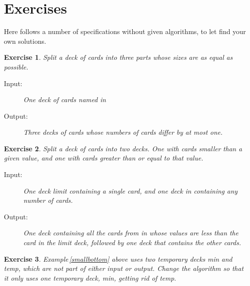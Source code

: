 \documentclass[a4paper,twoside]{tufte-handout}
\newtheorem{exercise}{Exercise}
\begin{document}
\clearpage

\section{Exercises}\label{sec-exer}

Here follows a number of specifications without given algorithms, to let
find your own solutions.

\begin{exercise}
  Split a deck of cards into three parts whose sizes are as equal as possible.
  \begin{description}
  \item[Input:] One deck of cards named \emph{in}
  \item[Output:] Three decks of cards whose numbers of cards differ by
    at most one.
 \end{description}
\end{exercise}

\begin{exercise}
  Split a deck of cards into two decks. One with cards smaller than a
  given value, and one with cards greater than or equal to that value.
  \begin{description}
  \item[Input:] One deck \emph{limit} containing a single card, and one
    deck \emph{in} containing any number of cards.
  \item[Output:] One deck containing all the
    cards from \emph{in} whose values are less than the card in the
    \emph{limit} deck, followed by one deck that contains
    the other cards.
  \end{description}
\end{exercise}

\begin{exercise}
  Example\,\ref{smallbottom} above uses two temporary decks \emph{min}
  and \emph{temp}, which are not part of either input or
  output. Change the algorithm so that it only uses one temporary
  deck, \emph{min}, getting rid of \emph{temp}.
\end{exercise}
\end{document}
